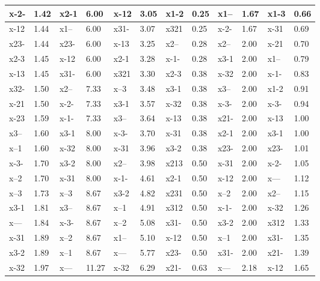 \begin{longtable}{| l | l || l | l || l | l || l | l || l | l || l | l |}
\hline
x-2- & 1.42  & x2-1 & 6.00  & x-12 & 3.05  & x1-2 & 0.25  & x1-- & 1.67  & x1-3 & 0.66 \\
\hline
x-12 & 1.44  & x1-- & 6.00  & x31- & 3.07  & x321 & 0.25  & x-2- & 1.67  & x-31 & 0.69 \\
\hline
x23- & 1.44  & x23- & 6.00  & x-13 & 3.25  & x2-- & 0.28  & x2-- & 2.00  & x-21 & 0.70 \\
\hline
x2-3 & 1.45  & x-12 & 6.00  & x2-1 & 3.28  & x-1- & 0.28  & x3-1 & 2.00  & x1-- & 0.79 \\
\hline
x-13 & 1.45  & x31- & 6.00  & x321 & 3.30  & x2-3 & 0.38  & x-32 & 2.00  & x-1- & 0.83 \\
\hline
x32- & 1.50  & x2-- & 7.33  & x--3 & 3.48  & x3-1 & 0.38  & x3-- & 2.00  & x1-2 & 0.91 \\
\hline
x-21 & 1.50  & x-2- & 7.33  & x3-1 & 3.57  & x-32 & 0.38  & x-3- & 2.00  & x-3- & 0.94 \\
\hline
x-23 & 1.59  & x-1- & 7.33  & x3-- & 3.64  & x-13 & 0.38  & x21- & 2.00  & x-13 & 1.00 \\
\hline
x3-- & 1.60  & x3-1 & 8.00  & x-3- & 3.70  & x-31 & 0.38  & x2-1 & 2.00  & x3-1 & 1.00 \\
\hline
x--1 & 1.60  & x-32 & 8.00  & x-31 & 3.96  & x3-2 & 0.38  & x23- & 2.00  & x23- & 1.01 \\
\hline
x-3- & 1.70  & x3-2 & 8.00  & x2-- & 3.98  & x213 & 0.50  & x-31 & 2.00  & x-2- & 1.05 \\
\hline
x--2 & 1.70  & x-31 & 8.00  & x-1- & 4.61  & x2-1 & 0.50  & x-12 & 2.00  & x--- & 1.12 \\
\hline
x--3 & 1.73  & x--3 & 8.67  & x3-2 & 4.82  & x231 & 0.50  & x--2 & 2.00  & x2-- & 1.15 \\
\hline
x3-1 & 1.81  & x3-- & 8.67  & x--1 & 4.91  & x312 & 0.50  & x-1- & 2.00  & x-32 & 1.26 \\
\hline
x--- & 1.84  & x-3- & 8.67  & x--2 & 5.08  & x31- & 0.50  & x3-2 & 2.00  & x312 & 1.33 \\
\hline
x-31 & 1.89  & x--2 & 8.67  & x1-- & 5.10  & x-12 & 0.50  & x--1 & 2.00  & x31- & 1.35 \\
\hline
x3-2 & 1.89  & x--1 & 8.67  & x--- & 5.77  & x23- & 0.50  & x31- & 2.00  & x21- & 1.39 \\
\hline
x-32 & 1.97  & x--- & 11.27  & x-32 & 6.29  & x21- & 0.63  & x--- & 2.18  & x-12 & 1.65 \\
\hline
\end{longtable}

